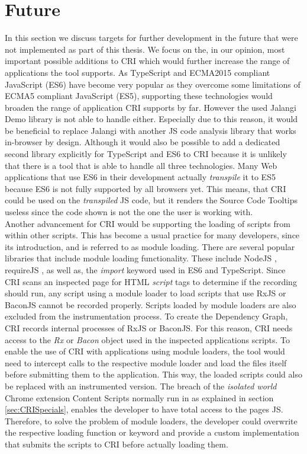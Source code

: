 \section{Future}
In this section we discuss targets for further development in the future that were not implemented as part of this thesis. We focus on the, in our opinion, most important possible additions to CRI which would further increase the range of applications the tool supports. %
As TypeScript and ECMA2015 compliant JavaScript (ES6) have become very popular as they overcome some limitations of ECMA5 compliant JavaScript (ES5), supporting these technologies would broaden the range of application CRI supports by far. However the used Jalangi Demo library is not able to handle either. Especially due to this reason, it would be beneficial to replace Jalangi with another JS code analysis library that works in-browser by design. Although it would also be possible to add a dedicated second library explicitly for TypeScript and ES6 to CRI because it is unlikely that there is a tool that is able to handle all three technologies. Many Web applications that use ES6 in their development actually \emph{transpile} it to ES5 because ES6 is not fully supported by all browsers yet. This means, that CRI could be used on the \emph{transpiled} JS code, but it renders the Source Code Tooltips useless since the code shown is not the one the user is working with.\\

Another advancement for CRI would be supporting the loading of scripts from within other scripts. This has become a usual practice for many developers, since its introduction, and is referred to as module loading. There are several popular libraries that include module loading functionality. These include NodeJS \cite{NodeJS}, requireJS \cite{RequireJS}, as well as, the \emph{import} keyword used in ES6 and TypeScript. Since CRI scans an inspected page for HTML \emph{script} tags to determine if the recording should run, any script using a module loader to load scripts that use RxJS or BaconJS cannot be recorded properly. Scripts loaded by module loaders are also excluded from the instrumentation process. To create the Dependency Graph, CRI records internal processes of RxJS or BaconJS. For this reason, CRI needs access to the \emph{Rx} or \emph{Bacon} object used in the inspected applications scripts. To enable the use of CRI with applications using module loaders, the tool would need to intercept calls to the respective module loader and load the files itself before submitting them to the application. This way, the loaded scripts could also be replaced with an instrumented version. The breach of the \emph{isolated world} Chrome extension Content Scripts normally run in as explained in section \ref{sec:CRISpecials}, enables the developer to have total access to the pages JS. Therefore, to solve the problem of module loaders, the developer could overwrite the respective loading function or keyword and provide a custom implementation that submits the scripts to CRI before actually loading them.
	
